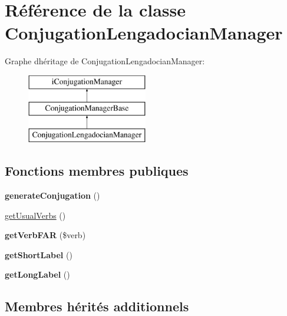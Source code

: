 \hypertarget{classConjugationLengadocianManager}{}\section{Référence de la classe Conjugation\+Lengadocian\+Manager}
\label{classConjugationLengadocianManager}
Graphe d\textquotesingle{}héritage de Conjugation\+Lengadocian\+Manager\+:\begin{figure}[H]
\begin{center}
\leavevmode
\includegraphics[height=3.000000cm]{classConjugationLengadocianManager}
\end{center}
\end{figure}
\subsection*{Fonctions membres publiques}
\begin{DoxyCompactItemize}
\item 
\hypertarget{classConjugationLengadocianManager_aaa61dfc0043e13de40d77255494cba82}{}\label{classConjugationLengadocianManager_aaa61dfc0043e13de40d77255494cba82} 
{\bfseries generate\+Conjugation} ()
\item 
\hyperlink{classConjugationLengadocianManager_a1ec18e3663eae35578b4f1967e4d981d}{get\+Usual\+Verbs} ()
\item 
\hypertarget{classConjugationLengadocianManager_a5e9c807113463d8d0044e3ba13937fa1}{}\label{classConjugationLengadocianManager_a5e9c807113463d8d0044e3ba13937fa1} 
{\bfseries get\+Verb\+F\+AR} (\$verb)
\item 
\hypertarget{classConjugationLengadocianManager_a87ad1195fe8eea002079c372843bb9fa}{}\label{classConjugationLengadocianManager_a87ad1195fe8eea002079c372843bb9fa} 
{\bfseries get\+Short\+Label} ()
\item 
\hypertarget{classConjugationLengadocianManager_ac14ff4edd45b3de2d303f2ac5fc94d91}{}\label{classConjugationLengadocianManager_ac14ff4edd45b3de2d303f2ac5fc94d91} 
{\bfseries get\+Long\+Label} ()
\end{DoxyCompactItemize}
\subsection*{Membres hérités additionnels}


